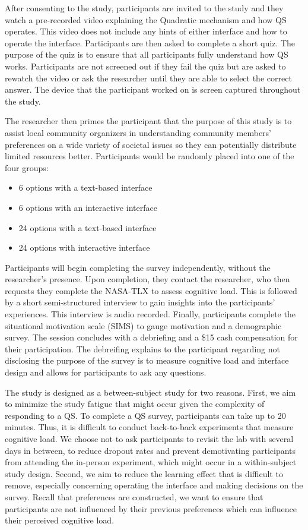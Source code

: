After consenting to the study, participants are invited to the study and they watch a pre-recorded video explaining the Quadratic mechanism and how QS operates. This video does not include any hints of either interface and how to operate the interface. Participants are then asked to complete a short quiz. The purpose of the quiz is to ensure that all participants fully understand how QS works. Participants are not screened out if they fail the quiz but are asked to rewatch the video or ask the researcher until they are able to select the correct answer. The device that the participant worked on is screen captured throughout the study.

The researcher then primes the participant that the purpose of this study is to assist local community organizers in understanding community members' preferences on a wide variety of societal issues so they can potentially distribute limited resources better. Participants would be randomly placed into one of the four groups:

\begin{itemize}
    \item 6 options with a text-based interface
    \item 6 options with an interactive interface
    \item 24 options with a text-based interface
    \item 24 options with interactive interface
\end{itemize}

Participants will begin completing the survey independently, without the researcher's presence. Upon completion, they contact the researcher, who then requests they complete the NASA-TLX to assess cognitive load. This is followed by a short semi-structured interview to gain insights into the participants' experiences. This interview is audio recorded. Finally, participants complete the situational motivation scale (SIMS) to gauge motivation and a demographic survey. The session concludes with a debriefing and a \$15 cash compensation for their participation. The debreifing explains to the participant regarding not disclosing the purpose of the survey is to measure cognitive load and interface design and allows for participants to ask any questions.

The study is designed as a between-subject study for two reasons. First, we aim to minimize the study fatigue that might occur given the complexity of responding to a QS. To complete a QS survey, participants can take up to 20 minutes. Thus, it is difficult to conduct back-to-back experiments that measure cognitive load. We choose not to ask participants to revisit the lab with several days in between, to reduce dropout rates and prevent demotivating participants from attending the in-person experiment, which might occur in a within-subject study design. Second, we aim to reduce the learning effect that is difficult to remove, especially concerning operating the interface and making decisions on the survey. Recall that preferences are constructed, we want to ensure that participants are not influenced by their previous preferences which can influence their perceived cognitive load.

